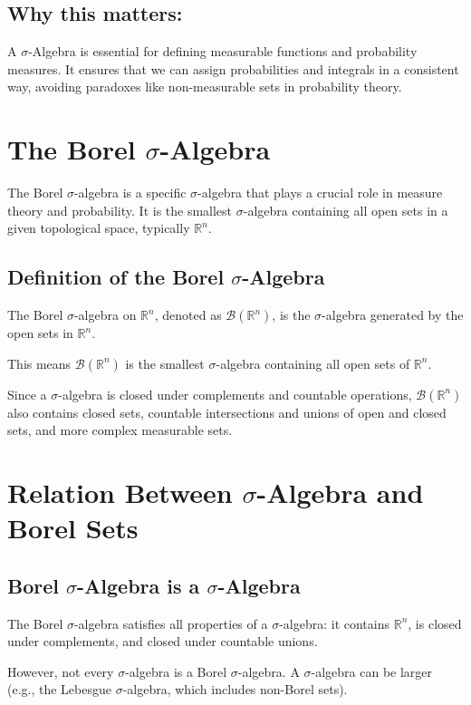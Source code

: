 \documentclass{article}
\begin{document}
\subsection*{Why this matters:}
A \(\sigma\)-Algebra is essential for defining measurable functions and probability measures. It ensures that we can assign probabilities and integrals in a consistent way, avoiding paradoxes like non-measurable sets in probability theory.

\section*{The Borel \(\sigma\)-Algebra}

The Borel \(\sigma\)-algebra is a specific \(\sigma\)-algebra that plays a crucial role in measure theory and probability. It is the smallest \(\sigma\)-algebra containing all open sets in a given topological space, typically \(\mathbb{R}^n\).

\subsection*{Definition of the Borel \(\sigma\)-Algebra}
The Borel \(\sigma\)-algebra on \(\mathbb{R}^n\), denoted as \(\mathcal{B}(\mathbb{R}^n)\), is the \(\sigma\)-algebra generated by the open sets in \(\mathbb{R}^n\). 

This means \(\mathcal{B}(\mathbb{R}^n)\) is the smallest \(\sigma\)-algebra containing all open sets of \(\mathbb{R}^n\). 

Since a \(\sigma\)-algebra is closed under complements and countable operations, \(\mathcal{B}(\mathbb{R}^n)\) also contains closed sets, countable intersections and unions of open and closed sets, and more complex measurable sets.

\section*{Relation Between \(\sigma\)-Algebra and Borel Sets}

\subsection*{Borel \(\sigma\)-Algebra is a \(\sigma\)-Algebra}
The Borel \(\sigma\)-algebra satisfies all properties of a \(\sigma\)-algebra: it contains \(\mathbb{R}^n\), is closed under complements, and closed under countable unions.

However, not every \(\sigma\)-algebra is a Borel \(\sigma\)-algebra. A \(\sigma\)-algebra can be larger (e.g., the Lebesgue \(\sigma\)-algebra, which includes non-Borel sets).
\end{document}
